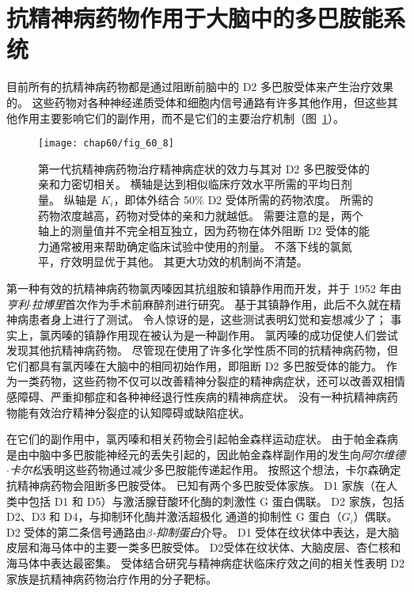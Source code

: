 \section{抗精神病药物作用于大脑中的多巴胺能系统}

目前所有的抗精神病药物都是通过阻断前脑中的 D2 多巴胺受体来产生治疗效果的。
这些药物对各种神经递质受体和细胞内信号通路有许多其他作用，但这些其他作用主要影响它们的副作用，而不是它们的主要治疗机制（图~\ref{fig:60_8}）。


\begin{figure}[htbp]
	\centering
	\texttt{[image: chap60/fig\_60\_8]}
	\caption{第一代抗精神病药物治疗精神病症状的效力与其对 D2 多巴胺受体的亲和力密切相关。
		横轴是达到相似临床疗效水平所需的平均日剂量。
		纵轴是 $ K_i $，即体外结合 50\% D2 受体所需的药物浓度。
		所需的药物浓度越高，药物对受体的亲和力就越低。
		需要注意的是，两个轴上的测量值并不完全相互独立，因为药物在体外阻断 D2 受体的能力通常被用来帮助确定临床试验中使用的剂量。
		不落下线的氯氮平，疗效明显优于其他。 其更大功效的机制尚不清楚\cite{seeman1976antipsychotic}。}
	\label{fig:60_8}
\end{figure}


第一种有效的抗精神病药物氯丙嗪因其抗组胺和镇静作用而开发，并于 1952 年由\textit{亨利$\cdot$拉博里}首次作为手术前麻醉剂进行研究。
基于其镇静作用，此后不久就在精神病患者身上进行了测试。
令人惊讶的是，这些测试表明幻觉和妄想减少了；
事实上，氯丙嗪的镇静作用现在被认为是一种副作用。
氯丙嗪的成功促使人们尝试发现其他抗精神病药物。
尽管现在使用了许多化学性质不同的抗精神病药物，但它们都具有氯丙嗪在大脑中的相同初始作用，即阻断 D2 多巴胺受体的能力。
作为一类药物，这些药物不仅可以改善精神分裂症的精神病症状，还可以改善双相情感障碍、严重抑郁症和各种神经退行性疾病的精神病症状。
没有一种抗精神病药物能有效治疗精神分裂症的认知障碍或缺陷症状。


在它们的副作用中，氯丙嗪和相关药物会引起帕金森样运动症状。
由于帕金森病是由中脑中多巴胺能神经元的丢失引起的，因此帕金森样副作用的发生向\textit{阿尔维德$\cdot$卡尔松}表明这些药物通过减少多巴胺能传递起作用。
按照这个想法，卡尔森确定抗精神病药物会阻断多巴胺受体。
已知有两个多巴胺受体家族。
D1 家族（在人类中包括 D1 和 D5）与激活腺苷酸环化酶的刺激性 G 蛋白偶联。
D2 家族，包括 D2、D3 和 D4，与抑制环化酶并激活超极化  通道的抑制性 G 蛋白（$ G_i $）偶联。
D2 受体的第二条信号通路由\textit{$\beta$-抑制蛋白}介导。
D1 受体在纹状体中表达，是大脑皮层和海马体中的主要一类多巴胺受体。
D2受体在纹状体、大脑皮层、杏仁核和海马体中表达最密集。
受体结合研究与精神病症状临床疗效之间的相关性表明 D2 家族是抗精神病药物治疗作用的分子靶标。



